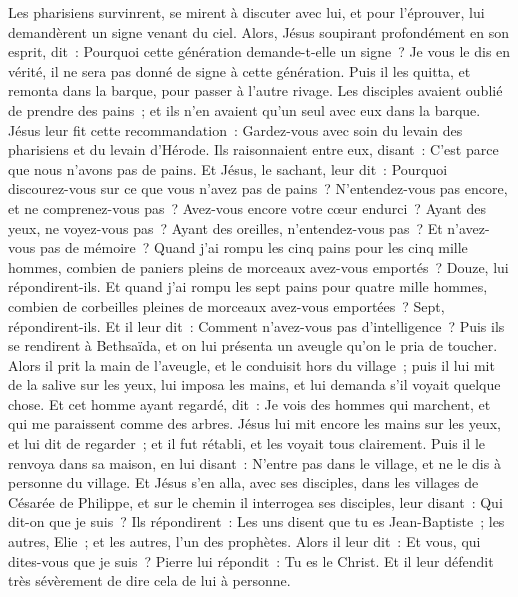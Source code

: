 \begin{multicols}{2}
Les pharisiens survinrent, se mirent à discuter avec lui, et pour l'éprouver, lui demandèrent un signe venant du ciel.
Alors, Jésus soupirant profondément en son esprit, dit~: Pourquoi cette génération demande-t-elle un signe~? Je vous le dis en vérité, il ne sera pas donné de signe à cette génération.
Puis il les quitta, et remonta dans la barque, pour passer à l'autre rivage.
Les disciples avaient oublié de prendre des pains~; et ils n'en avaient qu'un seul avec eux dans la barque.
Jésus leur fit cette recommandation~: Gardez-vous avec soin du levain des pharisiens et du levain d'Hérode.
Ils raisonnaient entre eux, disant~: C'est parce que nous n'avons pas de pains.
Et Jésus, le sachant, leur dit~: Pourquoi discourez-vous sur ce que vous n'avez pas de pains~? N'entendez-vous pas encore, et ne comprenez-vous pas~?
Avez-vous encore votre cœur endurci~? Ayant des yeux, ne voyez-vous pas~? Ayant des oreilles, n'entendez-vous pas~? Et n'avez-vous pas de mémoire~?
Quand j'ai rompu les cinq pains pour les cinq mille hommes, combien de paniers pleins de morceaux avez-vous emportés~? Douze, lui répondirent-ils.
Et quand j'ai rompu les sept pains pour quatre mille hommes, combien de corbeilles pleines de morceaux avez-vous emportées~? Sept, répondirent-ils.
Et il leur dit~: Comment n'avez-vous pas d'intelligence~?
Puis ils se rendirent à Bethsaïda, et on lui présenta un aveugle qu'on le pria de toucher.
Alors il prit la main de l'aveugle, et le conduisit hors du village~; puis il lui mit de la salive sur les yeux, lui imposa les mains, et lui demanda s'il voyait quelque chose.
Et cet homme ayant regardé, dit~: Je vois des hommes qui marchent, et qui me paraissent comme des arbres.
Jésus lui mit encore les mains sur les yeux, et lui dit de regarder~; et il fut rétabli, et les voyait tous clairement.
Puis il le renvoya dans sa maison, en lui disant~: N'entre pas dans le village, et ne le dis à personne du village.
Et Jésus s'en alla, avec ses disciples, dans les villages de Césarée de Philippe, et sur le chemin il interrogea ses disciples, leur disant~: Qui dit-on que je suis~?
Ils répondirent~: Les uns disent que tu es Jean-Baptiste~; les autres, Elie~; et les autres, l'un des prophètes.
Alors il leur dit~: Et vous, qui dites-vous que je suis~? Pierre lui répondit~: Tu es le Christ.
Et il leur défendit très sévèrement de dire cela de lui à personne.

\end{multicols}
